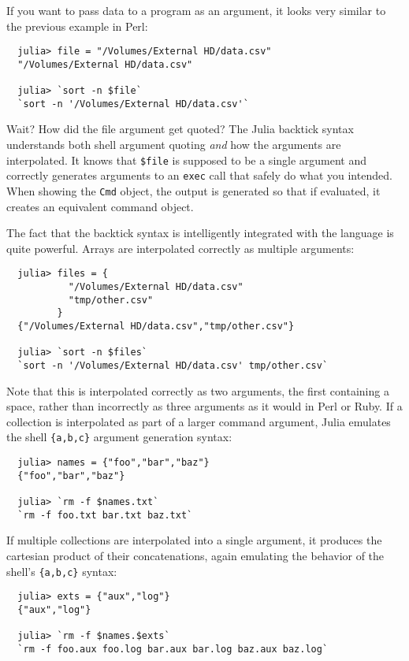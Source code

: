 \documentclass{article}
\begin{document}
If you want to pass data to a program as an argument, it looks very similar to the previous example in Perl:
\begin{verbatim}
  julia> file = "/Volumes/External HD/data.csv"
  "/Volumes/External HD/data.csv"

  julia> `sort -n $file`
  `sort -n '/Volumes/External HD/data.csv'`
\end{verbatim}
Wait? How did the file argument get quoted?
The Julia backtick syntax understands both shell argument quoting \emph{and} how the arguments are interpolated.
It knows that \verb|$file| is supposed to be a single argument and correctly generates arguments to an \verb|exec| call that safely do what you intended.
When showing the \verb|Cmd| object, the output is generated so that if evaluated, it creates an equivalent command object.

The fact that the backtick syntax is intelligently integrated with the language is quite powerful.
Arrays are interpolated correctly as multiple arguments:
\begin{verbatim}
  julia> files = {
           "/Volumes/External HD/data.csv"
           "tmp/other.csv"
         }
  {"/Volumes/External HD/data.csv","tmp/other.csv"}

  julia> `sort -n $files`
  `sort -n '/Volumes/External HD/data.csv' tmp/other.csv`
\end{verbatim}
Note that this is interpolated correctly as two arguments, the first containing a space, rather than incorrectly as three arguments as it would in Perl or Ruby.
If a collection is interpolated as part of a larger command argument, Julia emulates the shell \verb|{a,b,c}| argument generation syntax:
\begin{verbatim}
  julia> names = {"foo","bar","baz"}
  {"foo","bar","baz"}

  julia> `rm -f $names.txt`
  `rm -f foo.txt bar.txt baz.txt`
\end{verbatim}
If multiple collections are interpolated into a single argument, it produces the cartesian product of their concatenations, again emulating the behavior of the shell's \verb|{a,b,c}| syntax:
\begin{verbatim}
  julia> exts = {"aux","log"}
  {"aux","log"}

  julia> `rm -f $names.$exts`
  `rm -f foo.aux foo.log bar.aux bar.log baz.aux baz.log`
\end{verbatim}
\end{document}
